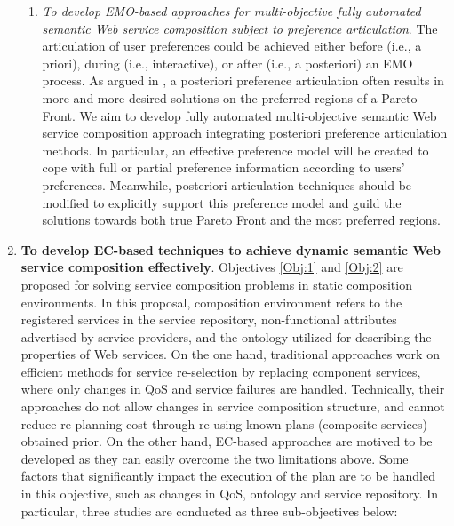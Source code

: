 \begin{enumerate}
\begin{enumerate}
    \item \emph{To develop EMO-based approaches for multi-objective fully automated semantic Web service composition subject to preference articulation}.  The articulation of user preferences could be achieved either before (i.e., a priori), during (i.e., interactive), or after (i.e., a posteriori) an EMO process. As argued in \cite{giagkiozis2014pareto}, a posteriori preference articulation often results in more and more desired solutions on the preferred regions of a Pareto Front. We aim to develop fully automated multi-objective semantic Web service composition approach integrating posteriori preference articulation methods. In particular, an effective preference model will be created to cope with full or partial preference information according to users' preferences. Meanwhile, posteriori articulation techniques should be modified to explicitly support this preference model and guild the solutions towards both true Pareto Front and the most preferred regions. 

   \end{enumerate}
   
\vspace{0.5cm}
 \item \textbf{To develop EC-based techniques to achieve dynamic semantic Web service composition effectively}. Objectives \ref{Obj:1} and \ref{Obj:2} are proposed for solving service composition problems in static composition environments. In this proposal, composition environment refers to the registered services in the service repository, non-functional attributes advertised by service providers, and the ontology utilized for describing the properties of Web services.  On the one hand, traditional approaches \cite{nasridinov2012qos,salas2006ws,wagner2016robust,yin2010qos} work on efficient methods for service re-selection by replacing component services, where only changes in QoS and service failures are handled. Technically, their approaches do not allow changes in service composition structure, and cannot reduce re-planning cost through re-using known plans (composite services) obtained prior. On the other hand, EC-based approaches are motived to be developed as they can easily overcome the two limitations above. Some factors that significantly impact the execution of the plan are to be handled in this objective, such as changes in QoS, ontology and service repository. In particular, three studies are conducted as three sub-objectives below:

 


\end{enumerate}

